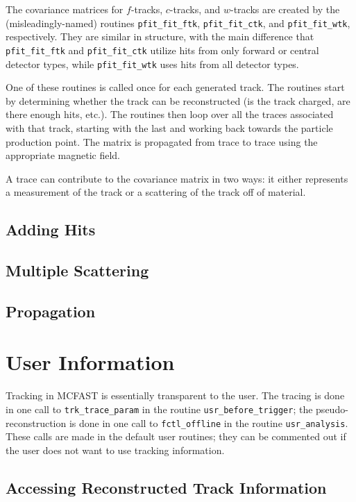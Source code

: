 The covariance matrices for $f$-tracks, $c$-tracks, and $w$-tracks are
created by the (misleadingly-named) routines \verb'pfit_fit_ftk',
\verb'pfit_fit_ctk', and \verb'pfit_fit_wtk', respectively.  They are
similar in structure, with the main difference that \verb'pfit_fit_ftk'
and \verb'pfit_fit_ctk' utilize hits from only forward or central
detector types, while \verb'pfit_fit_wtk' uses hits from all detector
types.

One of these routines is called once for each generated track.  The routines
start by determining whether the track can be reconstructed (is the track
charged, are there enough hits, etc.).  The routines then loop over all the
traces associated with that track, starting with the last and working back
towards the particle production point.  The matrix is propagated from trace
to trace using the appropriate magnetic field.

A trace can contribute to the covariance matrix in two ways: it either
represents a measurement of the track or a scattering of the track off of
material.

\subsection{Adding Hits}

\subsection{Multiple Scattering}

\subsection{Propagation}

\section{User Information}

Tracking in MCFAST is essentially transparent to the user.  The tracing is
done in one call to \verb'trk_trace_param' in the routine
\verb'usr_before_trigger'; the pseudo-reconstruction is done in one call to
\verb'fctl_offline' in the routine \verb'usr_analysis'.  These calls are made
in the default user routines; they can be commented out if the user does not
want to use tracking information.

\subsection{Accessing Reconstructed Track Information}

